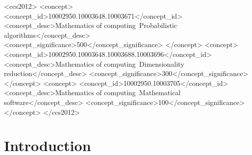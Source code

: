 \documentclass[sigconf]{acmart}  %
\begin{document}

\begin{CCSXML}
<ccs2012>
<concept>
<concept_id>10002950.10003648.10003671</concept_id>
<concept_desc>Mathematics of computing~Probabilistic algorithms</concept_desc>
<concept_significance>500</concept_significance>
</concept>
<concept>
<concept_id>10002950.10003648.10003688.10003696</concept_id>
<concept_desc>Mathematics of computing~Dimensionality reduction</concept_desc>
<concept_significance>300</concept_significance>
</concept>
<concept>
<concept_id>10002950.10003705</concept_id>
<concept_desc>Mathematics of computing~Mathematical software</concept_desc>
<concept_significance>100</concept_significance>
</concept>
</ccs2012>
\end{CCSXML}




\maketitle

\section{Introduction} \label{sec:intro}



\end{document}
